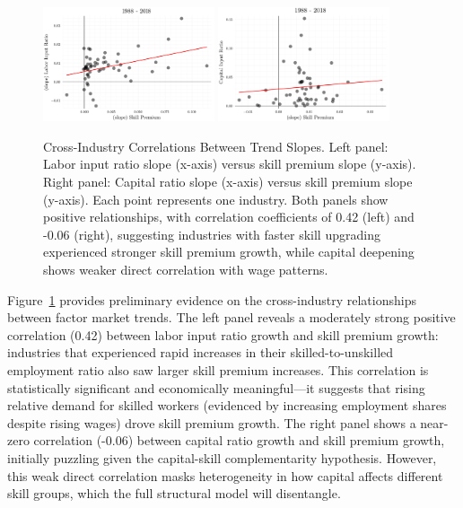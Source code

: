 \documentclass[12pt]{article}
\begin{document}
\begin{figure}[H]
 \centering
 \includegraphics[width=0.45\textwidth]{../images/trend_correlation_doc.pdf}
 \hfill
 \includegraphics[width=0.45\textwidth]{../images/trend_correlation_2_doc.pdf}
 \caption{\label{fig:trends_correlation} Cross-Industry Correlations Between Trend Slopes. Left panel: Labor input ratio slope (x-axis) versus skill premium slope (y-axis). Right panel: Capital ratio slope (x-axis) versus skill premium slope (y-axis). Each point represents one industry. Both panels show positive relationships, with correlation coefficients of 0.42 (left) and -0.06 (right), suggesting industries with faster skill upgrading experienced stronger skill premium growth, while capital deepening shows weaker direct correlation with wage patterns.}
\end{figure}

Figure~\ref{fig:trends_correlation} provides preliminary evidence on the cross-industry relationships between factor market trends. The left panel reveals a moderately strong positive correlation (0.42) between labor input ratio growth and skill premium growth: industries that experienced rapid increases in their skilled-to-unskilled employment ratio also saw larger skill premium increases. This correlation is statistically significant and economically meaningful---it suggests that rising relative demand for skilled workers (evidenced by increasing employment shares despite rising wages) drove skill premium growth. The right panel shows a near-zero correlation (-0.06) between capital ratio growth and skill premium growth, initially puzzling given the capital-skill complementarity hypothesis. However, this weak direct correlation masks heterogeneity in how capital affects different skill groups, which the full structural model will disentangle.
\end{document}
